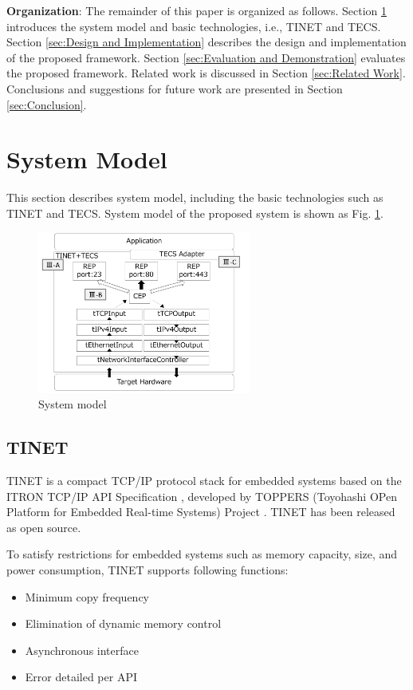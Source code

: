 \documentclass[conference]{IEEEtran/IEEEtran}
\begin{document}
{\bf Organization}: The remainder of this paper is organized as follows.
Section \ref{sec:System Model} introduces the system model and basic technologies, i.e., TINET and TECS.
Section \ref{sec:Design and Implementation} describes the design and implementation of the proposed framework.
Section \ref{sec:Evaluation and Demonstration} evaluates the proposed framework.
Related work is discussed in Section \ref{sec:Related Work}.
Conclusions and suggestions for future work are presented in Section \ref{sec:Conclusion}.


\section{System Model}
\label{sec:System Model}

This section describes system model, including the basic technologies such as TINET and TECS.
System model of the proposed system is shown as Fig. \ref{fig:System Model}.

\begin{figure}[t]
    \centering
    \includegraphics[width=7.0cm,clip]{figure/SystemModel.pdf}
    \caption{System model}
    \label{fig:System Model}
\end{figure}

\subsection{TINET}

TINET is a compact TCP/IP protocol stack for embedded systems based on the ITRON TCP/IP API Specification \cite{url:ITRON_TCP/IP_API_Spec}, developed by TOPPERS (Toyohashi OPen Platform for Embedded Real-time Systems) Project \cite{url:TOPPERS}.
TINET has been released as open source.

To satisfy restrictions for embedded systems such as memory capacity, size, and power consumption, TINET supports following functions:

\begin{itemize}
    \item Minimum copy frequency
    \item Elimination of dynamic memory control
    \item Asynchronous interface
    \item Error detailed per API
\end{itemize}
\end{document}
